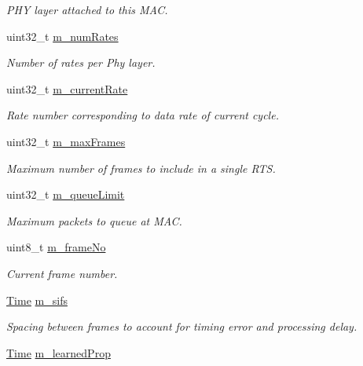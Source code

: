 \begin{DoxyCompactItemize}
\begin{DoxyCompactList}\small\item\em P\+HY layer attached to this M\+AC. \end{DoxyCompactList}\item 
uint32\+\_\+t \hyperlink{classns3_1_1UanMacRc_ae6371c67d521311d632f9bd80c657f2f}{m\+\_\+num\+Rates}
\begin{DoxyCompactList}\small\item\em Number of rates per Phy layer. \end{DoxyCompactList}\item 
uint32\+\_\+t \hyperlink{classns3_1_1UanMacRc_a994d8477f32862d6fa549e1782a8b699}{m\+\_\+current\+Rate}
\begin{DoxyCompactList}\small\item\em Rate number corresponding to data rate of current cycle. \end{DoxyCompactList}\item 
uint32\+\_\+t \hyperlink{classns3_1_1UanMacRc_ad5bf316ed55590834c10630bb5b7740d}{m\+\_\+max\+Frames}
\begin{DoxyCompactList}\small\item\em Maximum number of frames to include in a single R\+TS. \end{DoxyCompactList}\item 
uint32\+\_\+t \hyperlink{classns3_1_1UanMacRc_a23f9454b170213f244b931801f186efc}{m\+\_\+queue\+Limit}
\begin{DoxyCompactList}\small\item\em Maximum packets to queue at M\+AC. \end{DoxyCompactList}\item 
uint8\+\_\+t \hyperlink{classns3_1_1UanMacRc_a3ff882a28b30031c90ce3242eb2d2dab}{m\+\_\+frame\+No}
\begin{DoxyCompactList}\small\item\em Current frame number. \end{DoxyCompactList}\item 
\hyperlink{classns3_1_1Time}{Time} \hyperlink{classns3_1_1UanMacRc_abf32927f32a30e4a0b6793fee11b53d7}{m\+\_\+sifs}
\begin{DoxyCompactList}\small\item\em Spacing between frames to account for timing error and processing delay. \end{DoxyCompactList}\item 
\hyperlink{classns3_1_1Time}{Time} \hyperlink{classns3_1_1UanMacRc_a96cb22a43f018604074c8e73e711e9d7}{m\+\_\+learned\+Prop}

\end{DoxyCompactItemize}
